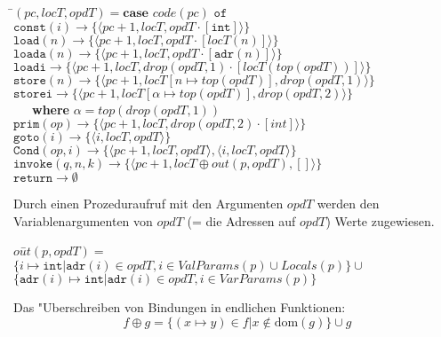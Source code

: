 \documentclass[german,10pt, a4paper, twocolumn]{scrartcl}
\theoremstyle{definition}
\theoremstyle{remark}
\begin{document}
\small
\begin{tabbing}
 \=$(pc,locT,opdT)= \textbf{case } code(pc) \texttt{ of}$\\
 \>	$\texttt{const}(i) \rightarrow \{\langle pc+1, locT, opdT\cdotp[\texttt{int}] \rangle\}$\\
 \>	$\texttt{load}(n) \rightarrow \{\langle pc+1, locT, opdT\cdotp[locT(n)] \rangle\}$\\
 \>	$\texttt{loada}(n) \rightarrow \{\langle pc+1, locT, opdT\cdotp[\texttt{adr}(n)] \rangle\}$\\
 \>	$\texttt{loadi} \rightarrow \{\langle pc+1, locT, drop(opdT,1)\cdotp[locT(top(opdT))] \rangle\}$\\
 \>	$\texttt{store}(n) \rightarrow \{\langle pc+1, locT[n\mapsto top(opdT)], drop(opdT,1) \rangle\}$\\
 \>	$\texttt{storei} \rightarrow \{\langle pc+1, locT[\alpha \mapsto top(opdT)], drop(opdT,2)\rangle\}$\\
 \>	\ \ \	\textbf{where } $\alpha = top(drop(opdT,1))$\\
 \>	$\texttt{prim}(op) \rightarrow \{\langle pc+1, locT, drop(opdT,2) \cdotp [int] \rangle\}$\\
 \>	$\texttt{goto}(i) \rightarrow \{\langle i, locT, opdT \rangle\}$\\
 \>	$\texttt{Cond}(op,i) \rightarrow \{\langle pc+1, locT, opdT\rangle,\langle i, locT, opdT \rangle\}$\\
 \>	$\texttt{invoke}(q,n,k) \rightarrow \{\langle pc+1, locT\oplus out(p,opdT), [] \rangle\}$\\
 \>	$\texttt{return} \rightarrow \emptyset$\\
\end{tabbing}
\normalsize

Durch einen Prozeduraufruf mit den Argumenten $opdT$ werden den Variablenargumenten von $opdT$ (= die Adressen auf $opdT$) Werte zugewiesen.

\small
\begin{tabbing}
 $ou$\=$t(p,opdT)=$ \\
 \>	$\{ i \mapsto \texttt{int} | \texttt{adr}(i) \in opdT, i \in ValParams(p) \cup Locals(p) \}\cup$\\
 \>	$\{ \texttt{adr}(i) \mapsto \texttt{int} | \texttt{adr}(i) \in opdT, i \in VarParams(p)\}$
\end{tabbing}
\normalsize

Das "Uberschreiben von Bindungen in endlichen Funktionen:
\begin{displaymath}
	f \oplus g = \{(x\mapsto y) \in f | x \not \in \mbox{dom}(g)\}\cup g
\end{displaymath}
\end{document}
